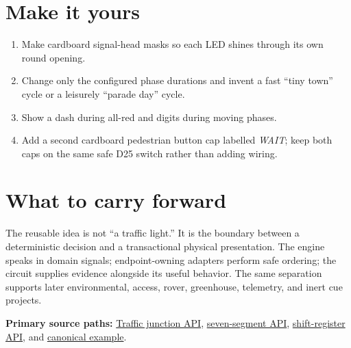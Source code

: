 \documentclass[11pt]{article}
\begin{document}
\section{Make it yours}

\begin{enumerate}
  \item Make cardboard signal-head masks so each LED shines through its own
        round opening.
  \item Change only the configured phase durations and invent a fast ``tiny
        town'' cycle or a leisurely ``parade day'' cycle.
  \item Show a dash during all-red and digits during moving phases.
  \item Add a second cardboard pedestrian button cap labelled \emph{WAIT};
        keep both caps on the same safe D25 switch rather than adding wiring.
\end{enumerate}

\section{What to carry forward}

The reusable idea is not ``a traffic light.'' It is the boundary between a
deterministic decision and a transactional physical presentation. The engine
speaks in domain signals; endpoint-owning adapters perform safe ordering; the
circuit supplies evidence alongside its useful behavior. The same separation
supports later environmental, access, rover, greenhouse, telemetry, and inert
cue projects.

\textbf{Primary source paths:}
\href{https://github.com/spincyc/adk/blob/main/src/traffic_junction.h}
{Traffic junction API},
\href{https://github.com/spincyc/adk/blob/main/src/seven_segment_display.h}
{seven-segment API},
\href{https://github.com/spincyc/adk/blob/main/src/shift_register.h}
{shift-register API}, and
\href{https://github.com/spincyc/adk/tree/main/examples/Lesson012TrafficJunction}
{canonical example}.
\end{document}
